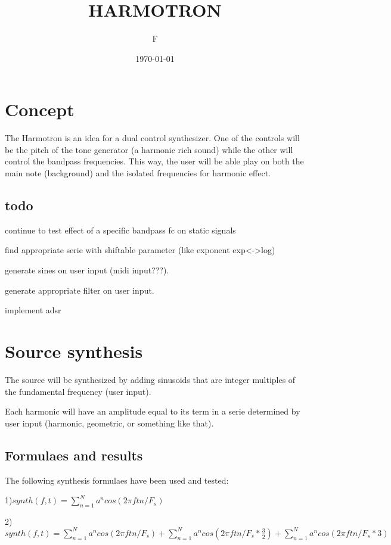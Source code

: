\documentclass{article}
\title{HARMOTRON}
\author{F}
\date{\today}
\begin{document}
\section{Concept}
The Harmotron is an idea for a dual control synthesizer. One of the controls
will be the pitch of the tone generator (a harmonic rich sound) while the other
will control the bandpass frequencies. This way, the user will be able play
on both the main note (background) and the isolated frequencies for harmonic
effect.

\subsection{todo}
\begin{description}
\item continue to test effect of a specific bandpass fc on static signals
\item find appropriate serie with shiftable parameter (like exponent exp<->log)
\item generate sines on user input (midi input???). 
\item generate appropriate filter on user input.
\item implement adsr
\end{description}


\section{Source synthesis}
The source will be synthesized by adding sinusoids that are integer multiples of
the fundamental frequency (user input). 

Each harmonic will have an amplitude equal to its term in a serie determined
by user input (harmonic, geometric, or something like that).

\subsection{Formulaes and results}
The following synthesis formulaes have been used and tested:
\begin{description}
\item 1)$synth(f, t) = \sum\limits_{n=1}^N a^n cos(2 \pi f t n /F_s)$
\item 2)$synth(f, t) = \sum\limits_{n=1}^N a^n cos(2 \pi f t n /F_s)
                     + \sum\limits_{n=1}^N a^n cos(2 \pi f t n /F_s * \frac{3}{2})
                     + \sum\limits_{n=1}^N a^n cos(2 \pi f t n /F_s * 3)$
\end{description}
\end{document}

